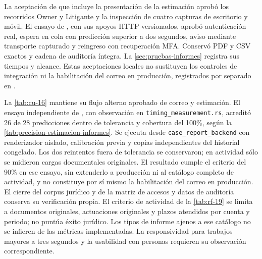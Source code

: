 La aceptaci\'on de  que
incluye la presentaci\'on de la estimaci\'on aprob\'o los recorridos Owner y
Litigante y la inspecci\'on de cuatro capturas de escritorio y m\'ovil. El ensayo de
, con sus apoyos
HTTP versionados, aprob\'o autenticaci\'on real, espera en cola con predicci\'on
superior a dos segundos, aviso mediante transporte capturado y reingreso con
recuperaci\'on MFA. Conserv\'o PDF y CSV exactos y cadena de auditor\'ia \'integra.
La \cref{sec:pruebas-informes} registra sus tiempos y alcance. Estas aceptaciones
locales no sustituyen los controles de integraci\'on ni la habilitaci\'on del correo
en producci\'on, registrados por separado en .

La \cref{tab:cu-16} mantiene su flujo alterno aprobado de correo y estimaci\'on.
El ensayo independiente de ,
con observaci\'on en \texttt{timing\_measurement.rs}, acredit\'o 26 de 28
predicciones dentro de tolerancia y cobertura del 100\%, seg\'un la
\cref{tab:precision-estimacion-informes}. Se ejecuta desde
\texttt{case\_report\_backend} con renderizador aislado, calibraci\'on previa y
copias independientes del historial congelado. Los dos reintentos fuera de
tolerancia se conservaron; en actividad s\'olo se midieron cargas documentales
originales. El resultado cumple el criterio del 90\% en ese ensayo, sin extenderlo
a producci\'on ni al cat\'alogo completo de actividad, y no constituye por s\'i mismo
la habilitaci\'on del correo en producci\'on.
El cierre del corpus jur\'idico y de la matriz de accesos y datos de auditor\'ia
conserva su verificaci\'on propia.
El criterio de actividad de la \cref{tab:rf-19} se limita a documentos originales,
actuaciones originales y plazos atendidos por cuenta y periodo; no puntúa
éxito jurídico. Los tipos de informe ajenos a ese catálogo no se infieren de
las métricas implementadas. La responsividad para trabajos mayores a tres
segundos y la usabilidad con personas requieren su observación correspondiente.
